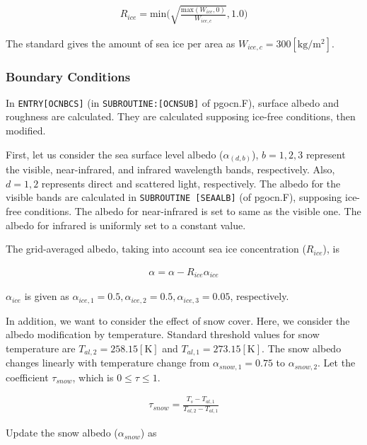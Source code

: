 \begin{eqnarray}
R_{ice} = \mathrm{min}\Big(\sqrt{\frac{\mathrm{max}(W_{ice},0)}{W_{ice,c}}},1.0\Big)
\end{eqnarray}

The standard gives the amount of sea ice per area as
\(W_{ice,c}=300 \mathrm{[kg/m^2]}\).

\hypertarget{boundary-conditions}{%
\subsubsection{Boundary Conditions}\label{boundary-conditions}}

In \texttt{ENTRY{[}OCNBCS{]}} (in \texttt{SUBROUTINE:{[}OCNSUB{]}} of
pgocn.F), surface albedo and roughness are calculated. They are
calculated supposing ice-free conditions, then modified.

First, let us consider the sea surface level albedo
(\(\alpha_{(d,b)}\)), \(b=1,2,3\) represent the visible, near-infrared,
and infrared wavelength bands, respectively. Also, \(d=1,2\) represents
direct and scattered light, respectively. The albedo for the visible
bands are calculated in \texttt{SUBROUTINE\ {[}SEAALB{]}} (of pgocn.F),
supposing ice-free conditions. The albedo for near-infrared is set to
same as the visible one. The albedo for infrared is uniformly set to a
constant value.

The grid-averaged albedo, taking into account sea ice concentration
(\(R_{ice}\)), is

\begin{eqnarray}
    \alpha = \alpha -R_{ice} \alpha_{ice}
\end{eqnarray}

\(\alpha_{ice}\) is given as
\(\alpha_{ice,1}=0.5,\alpha_{ice,2}=0.5,\alpha_{ice,3}=0.05\),
respectively.

In addition, we want to consider the effect of snow cover. Here, we
consider the albedo modification by temperature. Standard threshold
values for snow temperature are \(T_{al,2}=258.15 \mathrm{[K]}\) and
\(T_{al,1}=273.15 \mathrm{[K]}\). The snow albedo changes linearly with
temperature change from \(\alpha_{snow,1}=0.75\) to
\(\alpha_{ snow,2}\). Let the coefficient \(\tau_{snow}\), which is
\(0\le \tau \le 1\).

\begin{eqnarray}
\tau_{snow} = \frac{T_s - T_{al,1}}{T_{al,2}-T_{al,1}}
\end{eqnarray}

Update the snow albedo (\(\alpha_{snow}\)) as

